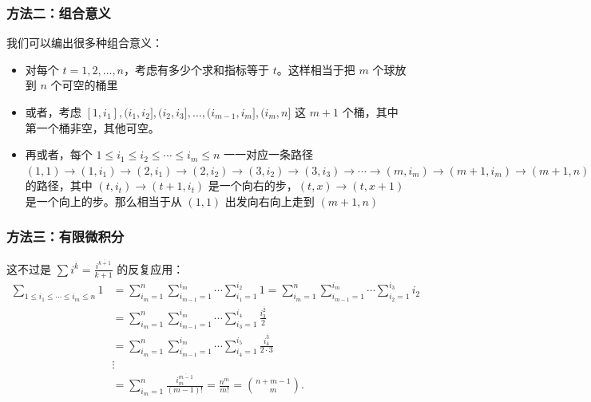 \subsubsection*{方法二：组合意义}
    我们可以编出很多种组合意义：
    \begin{itemize}
        \item 对每个 $t=1,2,\ldots,n$，考虑有多少个求和指标等于 $t$。这样相当于把 $m$ 个球放到 $n$ 个可空的桶里
        \item 或者，考虑 $[1,i_1],(i_1,i_2],(i_2,i_3],\ldots,(i_{m-1},i_m],(i_m,n]$ 这 $m+1$ 个桶，其中第一个桶非空，其他可空。
        \item 再或者，每个 $1\le i_1\le i_2\le\cdots\le i_m\le n$ 一一对应一条路径 $(1,1)\to (1,i_1)\to (2,i_1)\to (2,i_2)\to (3,i_2)\to (3,i_3)\to\cdots\to (m,i_m)\to (m+1,i_{m})\to (m+1,n)$ 的路径，其中 $(t,i_t)\to (t+1,i_t)$ 是一个向右的步，$(t,x)\to (t,x+1)$ 是一个向上的步。那么相当于从 $(1,1)$ 出发向右向上走到 $(m+1,n)$
    \end{itemize}
\subsubsection*{方法三：有限微积分}
    这不过是 $\sum i^{\overline{k}}=\frac{i^{\overline{k+1}}}{k+1}$ 的反复应用：    
$$
    \begin{aligned}
    \sum_{1\le i_1\le \cdots\le i_m\le n}1
    &=\sum_{i_m=1}^n\sum_{i_{m-1}=1}^{i_m}\cdots\sum_{i_1=1}^{i_2}1=\sum_{i_m=1}^n\sum_{i_{m-1}=1}^{i_m}\cdots\sum_{i_2=1}^{i_3}i_2\\
    &=\sum_{i_m=1}^n\sum_{i_{m-1}=1}^{i_m}\cdots\sum_{i_3=1}^{i_4}\frac{i_3^{\overline{2}}}{2}\\
    &=\sum_{i_m=1}^n\sum_{i_{m-1}=1}^{i_m}\cdots\sum_{i_4=1}^{i_5}\frac{i_4^{\overline{3}}}{2\cdot 3}\\
    &\vdots\\
    &=\sum_{i_m=1}^n\frac{i_m^{\overline{m-1}}}{(m-1)!}=\frac{n^{\overline{m}}}{m!}=\binom{n+m-1}{m}.
    \end{aligned}
    $$
